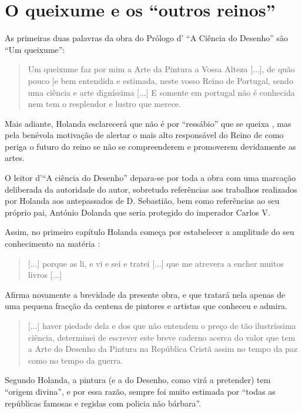 \documentclass{article}
\begin{document}
\section{O queixume e os ``outros reinos''}

As primeiras duas palavras da obra do Prólogo d' ``A Ciência do
Desenho'' são ``Um queixume'':

\begin{quote}
  Um queixume faz por mim a Arte da Pintura a Vossa Alteza [...], de
  quão pouco ]e bem entendida e estimada, neste vosso Reino de
    Portugal, sendo uma ciência e arte digníssima [...] E somente em
    portugal não é conhecida nem tem o resplendor e lustro que merece.
\end{quote}

Mais adiante, Holanda esclarecerá que não é por ``ressábio'' que se
queixa \cite[fl.36v]{holanda}, mas pela benévola motivação de alertar
o mais alto responsável do Reino de como periga o futuro do reino se
não se compreenderem e promoverem devidamente as artes.

O leitor d'``A ciência do Desenho'' depara-se por toda a obra com uma
marcação deliberada da autoridade do autor, sobretudo referências aos
trabalhos realizados por Holanda aos antepassados de D. Sebastião, bem
como referências ao seu próprio pai, António Dolanda que seria
protegido do imperador Carlos V.

Assim, no primeiro capítulo Holanda começa por estabelecer a amplitude
do seu conhecimento na matéria \cite[fl.34r]{holanda}:

\begin{quote}
  [...] porque as li, e vi e sei e tratei [...] que me atrevera a
  encher muitos livros [...]
\end{quote}

Afirma novamente a brevidade da presente obra, e que tratará nela
apenas de uma pequena fracção da centena de pintores e artistas que
conheceu e admira.

\begin{quote}
  [...] haver piedade dela e dos que não entendem o preço de tão
  ilustríssima ciência, determinei de escrever este breve caderno
  acerca do valor que tem a Arte do Desenho da Pintura na República
  Cristã assim no tempo da paz como no tempo da guerra.
\end{quote}

Segundo Holanda, a pintura (e a do Desenho, como virá a pretender) tem
``origem divina'', e por essa razão, sempre foi muito estimada por
``todas as repúblicas famosas e regidas com policia não bárbara''.
\end{document}
